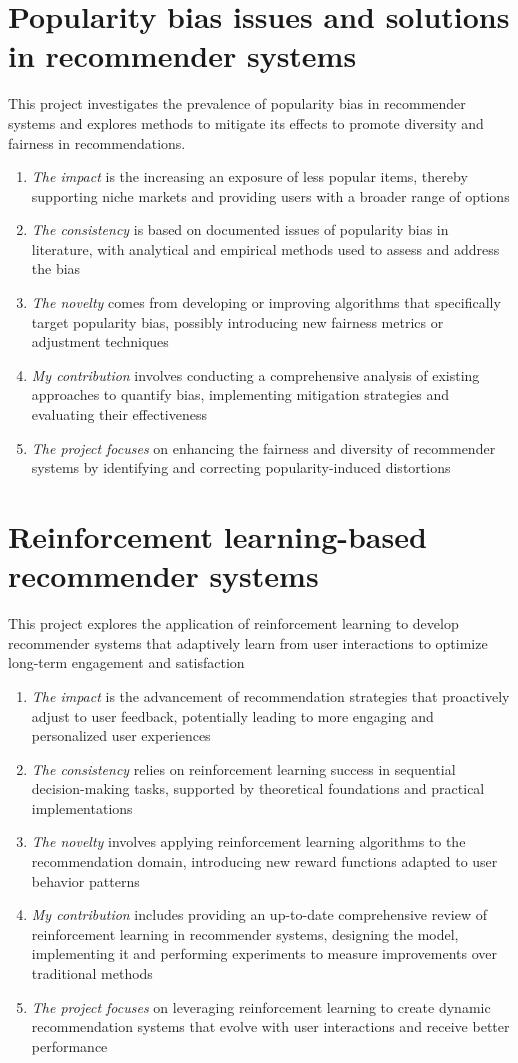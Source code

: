 \documentclass[12pt]{article}
\begin{document}
\section{Popularity bias issues and solutions in recommender systems}
This project investigates the prevalence of popularity bias in recommender systems and explores methods to mitigate its effects to promote diversity
and fairness in recommendations.
\begin{enumerate}
\item \emph{The impact} is the increasing an exposure of less popular items, thereby supporting niche markets and providing users with a broader
range of options
\item \emph{The consistency} is based on documented issues of popularity bias in literature, with analytical and empirical methods used to assess
and address the bias
\item \emph{The novelty} comes from developing or improving algorithms that specifically target popularity bias, possibly introducing new fairness
metrics or adjustment techniques
\item \emph{My contribution} involves conducting a comprehensive analysis of existing approaches to quantify bias, implementing mitigation
strategies and evaluating their effectiveness
\item \emph{The project focuses} on enhancing the fairness and diversity of recommender systems by identifying and correcting popularity-induced
distortions
\end{enumerate}

\section{Reinforcement learning-based recommender systems}
This project explores the application of reinforcement learning to develop recommender systems that adaptively learn from user interactions to
optimize long-term engagement and satisfaction
\begin{enumerate}
\item \emph{The impact} is the advancement of recommendation strategies that proactively adjust to user feedback, potentially leading to more
engaging and personalized user experiences
\item \emph{The consistency} relies on reinforcement learning success in sequential decision-making tasks, supported by theoretical foundations
and practical implementations
\item \emph{The novelty} involves applying reinforcement learning algorithms to the recommendation domain, introducing new reward functions
adapted to user behavior patterns
\item \emph{My contribution} includes providing an up-to-date comprehensive review of reinforcement learning in recommender systems, designing the
model, implementing it and performing experiments to measure improvements over traditional methods
\item \emph{The project focuses} on leveraging reinforcement learning to create dynamic recommendation systems that evolve with user interactions
and receive better performance
\end{enumerate}
\end{document}
